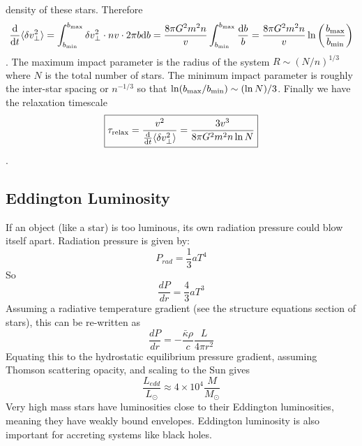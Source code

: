 density of these stars.  Therefore
\begin{dmath*}
    \frac{\d}{\d t} \langle\delta v_\perp^2\rangle
        = \int_{b_{\rm min}}^{b_{\rm max}} \delta v_\perp^2 \cdot nv \cdot 2\pi b\d b
        = \frac{8\pi G^2m^2n}{v}\int_{b_{\rm min}}^{b_{\rm max}} \frac{\d b}{b}
        = \frac{8\pi G^2m^2n}{v} \ln\left(\frac{b_{\rm max}}{b_{\rm min}}\right)
\end{dmath*}.
The maximum impact parameter is the radius of the system $R\sim(N/n)^{1/3}$ where
$N$ is the total number of stars.  The minimum impact parameter is roughly the
inter-star spacing or $n^{-1/3}$ so that $\ln(b_{\rm max}/b_{\rm min}) \sim (\ln N)/3$.
Finally we have the relaxation timescale
\begin{dmath}\boxed{
    \tau_{\rm relax} = \frac{v^2}{\frac{\d}{\d t}\langle\delta v_\perp^2\rangle} \nolinebreak
                     = \frac{3v^3}{8\pi G^2m^2n\ln N}
}\end{dmath}.

\subsection{Eddington Luminosity}
If an object (like a star) is too luminous, its own radiation pressure could 
blow itself apart.  Radiation pressure is given by:
\begin{equation}
P_{rad}=\frac{1}{3}aT^4
\end{equation}
So
\begin{equation}
\frac{dP}{dr}=\frac{4}{3}aT^3
\end{equation}
Assuming a radiative temperature gradient (see the structure equations section 
of stars), this can be re-written as
\begin{equation}
\frac{dP}{dr}=-\frac{\bar{\kappa}\rho}{c}\frac{L}{4\pi r^2}
\end{equation}
Equating this to the hydrostatic equilibrium pressure gradient, assuming 
Thomson scattering opacity, and scaling to the Sun gives
\begin{equation}
\boxed{\frac{L_{edd}}{L_{\odot}}\approx 4\times10^4\frac{M}{M_{\odot}}}
\end{equation}
Very high mass stars have luminosities close to their Eddington luminosities, 
meaning they have weakly bound envelopes.  Eddington luminosity is also 
important for accreting systems like black holes.  



